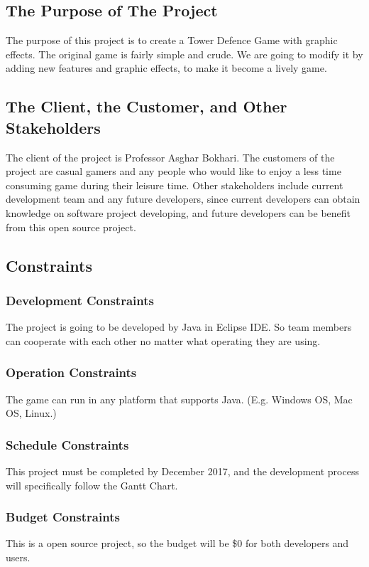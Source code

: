 \documentclass[12pt]{article}
\begin{document}
\subsection{The Purpose of The Project}
The purpose of this project is to create a Tower Defence Game with graphic effects. The original game is fairly simple and crude. We are going to modify it by adding new features and graphic effects, to make it become a lively game.


\subsection{The Client, the Customer, and Other Stakeholders}
The client of the project is Professor Asghar Bokhari. The customers of the project are casual gamers and any people who would like to enjoy a less time consuming game during their leisure time. Other stakeholders include current development team and any future developers, since current developers can obtain knowledge on software project developing, and future developers can be benefit from this open source project. 

\subsection{Constraints}
\subsubsection{Development Constraints}
The project is going to be developed by Java in Eclipse IDE. So team members can cooperate with each other no matter what operating they are using.

\subsubsection{Operation Constraints}
The game can run in any platform that supports Java. (E.g. Windows OS, Mac OS, Linux.)

\subsubsection{Schedule Constraints}
This project must be completed by December 2017, and the development process will specifically follow the Gantt Chart.

\subsubsection{Budget Constraints}
This is a open source project, so the budget will be \$0 for both developers and users.
\end{document}
